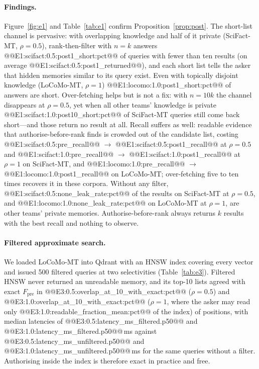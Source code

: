 \documentclass[11pt,a4paper]{article}
\theoremstyle{remark}
\begin{document}
\paragraph{Findings.} Figure~\ref{fig:e1} and Table~\ref{tab:e1} confirm Proposition~\ref{prop:post}. The short-list
channel is pervasive: with overlapping knowledge and half of it private (SciFact-MT, $\rho=0.5$), rank-then-filter with
$n=k$ answers @@E1:scifact:0.5:post1_short:pct@@ of queries with fewer than ten results (on average
@@E1:scifact:0.5:post1_returned@@), and each short list tells the asker that hidden memories similar to its query exist.
Even with topically disjoint knowledge (LoCoMo-MT, $\rho=1$) @@E1:locomo:1.0:post1_short:pct@@ of answers are short.
Over-fetching helps but is not a fix: with $n=10k$ the channel disappears at $\rho=0.5$, yet when all other teams'
knowledge is private @@E1:scifact:1.0:post10_short:pct@@ of SciFact-MT queries still come back short---and those return
no result at all. Recall suffers as well: readable evidence that authorise-before-rank finds is crowded out of the candidate
list, costing @@E1:scifact:0.5:pre_recall@@ $\rightarrow$ @@E1:scifact:0.5:post1_recall@@ at $\rho=0.5$ and
@@E1:scifact:1.0:pre_recall@@ $\rightarrow$ @@E1:scifact:1.0:post1_recall@@ at $\rho=1$ on SciFact-MT, and
@@E1:locomo:1.0:pre_recall@@ $\rightarrow$ @@E1:locomo:1.0:post1_recall@@ on LoCoMo-MT; over-fetching five to ten times
recovers it in these corpora. Without any filter, @@E1:scifact:0.5:none_leak_rate:pct@@ of the results on SciFact-MT at
$\rho=0.5$, and @@E1:locomo:1.0:none_leak_rate:pct@@ on LoCoMo-MT at $\rho=1$, are other teams' private memories.
Authorise-before-rank always returns $k$ results with the best recall and nothing to observe.

\paragraph{Filtered approximate search.} We loaded LoCoMo-MT into Qdrant with an HNSW index covering every vector and
issued 500 filtered queries at two selectivities (Table~\ref{tab:e3}). Filtered HNSW never returned an unreadable
memory, and its top-10 lists agreed with exact $F_{\mathrm{pre}}$ in @@E3:0.5:overlap_at_10_with_exact:pct@@ ($\rho=0.5$) and
@@E3:1.0:overlap_at_10_with_exact:pct@@ ($\rho=1$, where the asker may read only @@E3:1.0:readable_fraction_mean:pct@@ of the index) of
positions, with median latencies of @@E3:0.5:latency_ms_filtered.p50@@ and @@E3:1.0:latency_ms_filtered.p50@@\,ms against
@@E3:0.5:latency_ms_unfiltered.p50@@ and @@E3:1.0:latency_ms_unfiltered.p50@@\,ms for the same queries without a filter.
Authorising inside the index is therefore exact in practice and free.
\end{document}
